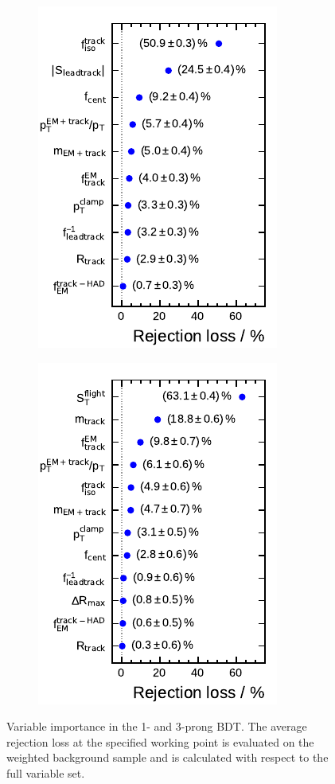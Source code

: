 \begin{figure}[htb]
  \centering
  \begin{subfigure}[t]{0.48\textwidth}
    \centering
    \includegraphics{./figures/bdt_perf/var_importance/1p_iter1.pdf}
  \end{subfigure}\hfill
  \begin{subfigure}[t]{0.48\textwidth}
    \centering
    \includegraphics{./figures/bdt_perf/var_importance/3p_iter1.pdf}
  \end{subfigure}
  \caption[Variable importance ranking for the 1- and 3-prong BDT]{Variable
    importance in the 1- and 3-prong BDT. The average rejection loss at the
    specified working point is evaluated on the weighted background sample and
    is calculated with respect to the full variable set. }
  \label{fig:variable_importance}
\end{figure}

